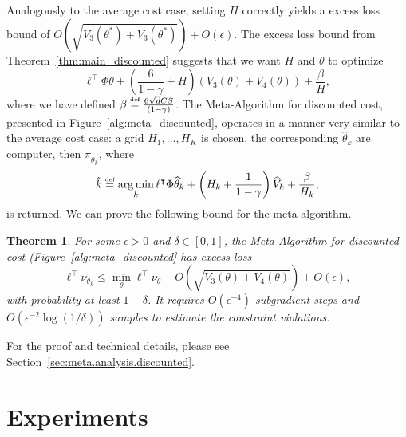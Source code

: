 \documentclass[11pt]{article}
\newtheorem{theorem}{Theorem}
\newcommand{\df}{\stackrel{\mbox{\rm\tiny def}}{=}}
\begin{document}
Analogously to the average cost case, setting $H$ correctly yields a excess loss bound of $O\left(\sqrt{V_3(\theta^*) + V_3(\theta^*)}\right) + O(\epsilon)$. The excess loss bound from Theorem~\ref{thm:main_discounted} suggests that we want $H$ and $\theta$ to optimize
\[
    \ell^{\top} \Phi\theta
    +\left( \frac{6}{1-\gamma} + H \right)
    \left(V_3(\theta)+V_4(\theta)\right)
    +\frac{\beta}{H},
\]
where we have defined $\beta\df \frac{6\sqrt{d}CS}{(1-\gamma)}$. The Meta-Algorithm for discounted cost, presented in Figure~\ref{alg:meta_discounted}, operates in a manner very similar to the average cost case: a grid $H_1,\ldots, H_K$ is chosen, the corresponding $\widehat\theta_k$ are computer, then $\pi_{\widehat\theta_{\hat k}}$, where 
\begin{equation*}
    \hat k \df \argmin_k \ell^\top\Phi\widehat\theta_k + \left(H_k+\frac{1}{1-\gamma}\right) \widehat V_k + \frac{\beta}{H_k},
  \end{equation*}
is returned.  We can prove the following bound for the meta-algorithm.
\begin{theorem}  
  \label{thm:H_opt_discounted_cost}
  For some $\epsilon>0$ and $\delta \in [0,1]$, the Meta-Algorithm for discounted cost (Figure~\ref{alg:meta_discounted} has excess loss
\begin{equation*}
  \ell^\top\nu_{\theta_{\hat k}} \leq \min_\theta \ell^\top\nu_\theta
  + O\left(\sqrt{V_3(\theta)+V_4(\theta)}\right)
  + O(\epsilon),
\end{equation*}
with probability at least $1-\delta$.
It requires  $O\left(\epsilon^{-4}\right)$ subgradient steps and $O\left(\epsilon^{-2}\log(1/\delta)\right)$ samples to estimate the constraint violations.
\end{theorem}
For the proof and technical details, please see Section~\ref{sec:meta.analysis.discounted}.

\section{Experiments}
\label{sec:experiments}
\end{document}
